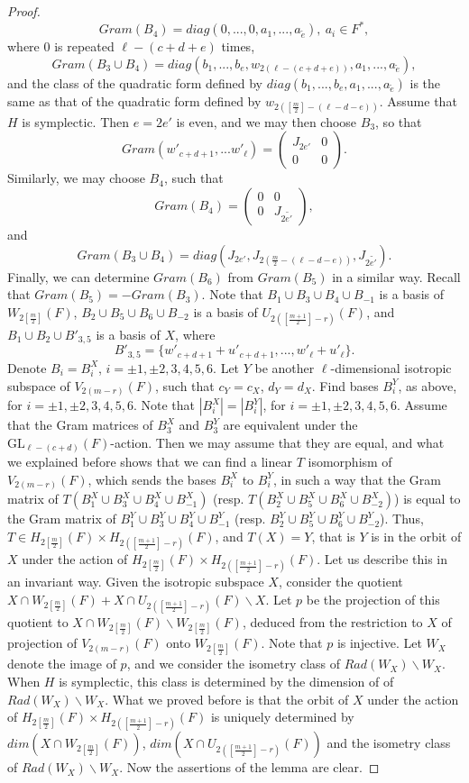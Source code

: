 \documentclass[12pts]{amsart}
\newcommand{\GL}{{\mathrm{GL}}}
\begin{document}
\begin{proof}
$$
Gram(B_4)=diag(0,...,0,a_1,...,a_{\tilde{e}}),\ a_i\in F^*,
$$
where $0$ is repeated $\ell-(c+d+e)$ times,
$$
Gram(B_3\cup B_4)= diag(b_1,...,b_e,w_{2(\ell-(c+d+e))},a_1,...,a_{\tilde{e}}),
$$
and the class of the quadratic form defined by $diag(b_1,...,b_e,a_1,...,a_{\tilde{e}})$ is the same as that of the quadratic form defined by $w_{2([\frac{m}{2}]-(\ell-d-e))}$.
Assume that $H$ is symplectic. Then $e=2e'$ is even, and we may then choose $B_3$, so that
$$
Gram(w'_{c+d+1},...w'_\ell)=\begin{pmatrix}J_{2e'}&0\\0&0\end{pmatrix}.
$$
Similarly, we may choose $B_4$, such that
$$
Gram(B_4)=\begin{pmatrix}0&0\\0&J_{2\tilde{e'}}\end{pmatrix},
$$
and
$$
Gram(B_3\cup B_4)=diag(J_{2e'},J_{2(\frac{m}{2}-(\ell-d-e))},J_{2\tilde{e'}}).
$$
Finally, we can determine $Gram(B_6)$ from $Gram (B_5)$ in a similar way. Recall that $Gram(B_5)=-Gram(B_3)$.
Note that $B_1\cup B_3\cup B_4\cup B_{-1}$ is a basis of $W_{2[\frac{m}{2}]}(F)$, $B_2\cup B_5\cup B_6\cup B_{-2}$ is a basis of $U_{2([\frac{m+1}{2}]-r)}(F)$, and $B_1\cup B_2\cup B'_{3,5}$ is a basis of $X$, where
$$
B'_{3,5}=\{w'_{c+d+1}+u'_{c+d+1},...,w'_\ell+u'_\ell\}.
$$  
Denote $B_i=B_i^X$, $i=\pm 1, \pm 2, 3,4,5,6$. Let $Y$ be another $\ell$-dimensional isotropic subspace of $V_{2(m-r)}(F)$, such that $c_Y=c_X$, $d_Y=d_X$. Find bases $B_i^Y$, as above, for $i=\pm 1, \pm 2, 3,4,5,6$. Note that $|B_i^X|=|B_i^Y|$, for $i=\pm 1, \pm 2, 3,4,5,6$. Assume that the Gram matrices of $B_3^X$ and $B_3^Y$ are equivalent under the $\GL_{\ell-(c+d)}(F)$-action. Then we may assume that they are equal, and what we explained before shows that we can find a linear $T$ isomorphism of $V_{2(m-r)}(F)$, which sends the bases $B_i^X$ to $B_i^Y$, in such a way that the Gram matrix of $T(B^X_1\cup B^X_3\cup B^X_4\cup B^X_{-1})$ (resp. $T(B^X_2\cup B^X_5\cup B^X_6\cup B^X_{-2})$) is equal to the Gram matrix of $B^Y_1\cup B^Y_3\cup B^Y_4\cup B^Y_{-1}$ (resp. $B^Y_2\cup B^Y_5\cup B^Y_6\cup B^Y_{-2}$). Thus, $T\in H_{2[\frac{m}{2}]}(F)\times H_{2([\frac{m+1}{2}]-r)}(F)$, and $T(X)=Y$, that is $Y$ is in the orbit of $X$ under the action of $H_{2[\frac{m}{2}]}(F)\times H_{2([\frac{m+1}{2}]-r)}(F)$. Let us describe this in an invariant way. Given the isotropic subspace $X$, consider the quotient $X\cap W_{2[\frac{m}{2}]}(F)+X\cap U_{2([\frac{m+1}{2}]-r)}(F)\backslash X$. Let $p$ be the projection of this quotient to $X\cap W_{2[\frac{m}{2}]}(F)\backslash W_{2[\frac{m}{2}]}(F)$, deduced from the restriction to $X$ of projection of $V_{2(m-r)}(F)$ onto $W_{2[\frac{m}{2}]}(F)$. Note that $p$ is injective. Let $W_X$ denote the image of $p$, and we consider the isometry class of $Rad(W_X)\backslash W_X$. When $H$ is symplectic, this class is determined by the dimension of of $Rad(W_X)\backslash W_X$. What we proved before is that the orbit of $X$ under the action of $H_{2[\frac{m}{2}]}(F)\times H_{2([\frac{m+1}{2}]-r)}(F)$ is uniquely determined by $dim (X\cap W_{2[\frac{m}{2}]}(F))$, $dim (X\cap U_{2([\frac{m+1}{2}]-r)}(F))$ and the isometry class of $Rad(W_X)\backslash W_X$. Now the assertions of the lemma are clear.	
\end{proof}
\end{document}
